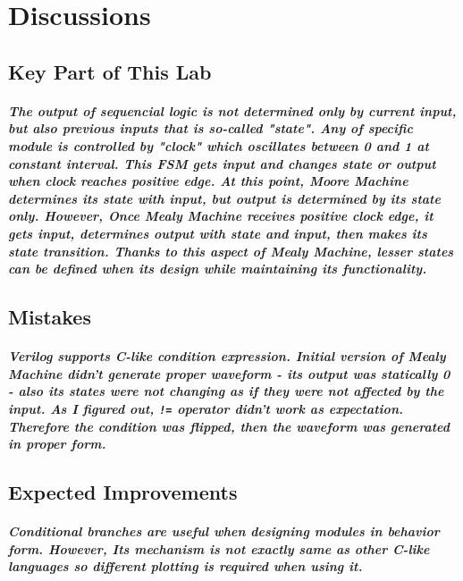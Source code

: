 \documentclass{report}
\begin{document}
    \chapter{Discussions}
        \section{Key Part of This Lab}
            \paragraph{\normalfont The output of sequencial logic is not determined only by current input, but also previous inputs that is so-called "state". Any of specific module is controlled by "clock" which oscillates between 0 and 1 at constant interval. This FSM gets input and changes state or output when clock reaches positive edge. At this point, Moore Machine determines its state with input, but output is determined by its state only. However, Once Mealy Machine receives positive clock edge, it gets input, determines output with state and input, then makes its state transition. Thanks to this aspect of Mealy Machine, lesser states can be defined when its design while maintaining its functionality.}

        \section{Mistakes}
            \paragraph{\normalfont Verilog supports C-like condition expression. Initial version of Mealy Machine didn't generate proper waveform - its output was statically 0 - also its states were not changing as if they were not affected by the input. As I figured out, \texttt{!=} operator didn't work as expectation. Therefore the condition was flipped, then the waveform was generated in proper form.  }

        \section{Expected Improvements}
            \paragraph{\normalfont Conditional branches are useful when designing modules in behavior form. However, Its mechanism is not exactly same as other C-like languages so different plotting is required when using it.}
\end{document}
